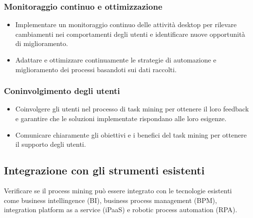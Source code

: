 \documentclass{article}
\begin{document}
\subsubsection{Monitoraggio continuo e ottimizzazione}
\begin{itemize}
    \item Implementare un monitoraggio continuo delle attività desktop per rilevare cambiamenti nei comportamenti degli utenti e identificare nuove opportunità di miglioramento.
    \item Adattare e ottimizzare continuamente le strategie di automazione e miglioramento dei processi basandoti sui dati raccolti.
\end{itemize}
\subsubsection{Coninvolgimento degli utenti}
\begin{itemize}
    \item Coinvolgere gli utenti nel processo di task mining per ottenere il loro feedback e garantire che le soluzioni implementate rispondano alle loro esigenze.
    \item Comunicare chiaramente gli obiettivi e i benefici del task mining per ottenere il supporto degli utenti.
\end{itemize}
\subsection{Integrazione con gli strumenti esistenti}
Verificare se il process mining può essere integrato con le tecnologie esistenti come business intellingence (BI), business process management (BPM), integration platform as a service (iPaaS) e robotic process automation (RPA).
\end{document}

